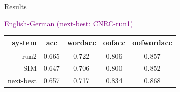 \documentclass[final,t]{beamer}
\begin{document}
\begin{frame}{}
\begin{columns}[t]
\begin{column}{.5\linewidth}




\begin{block}{Results}

\begin{center}
  \textcolor{purple}{English-German (next-best: CNRC-run1)}
  \begin{center}
  \begin{tabular}{|r|c|c|c|c|}
    \hline
    system & acc      & wordacc  & oofacc & oofwordacc \\
    \hline
    run2  &  0.665 & 0.722  &  0.806  & 0.857 \\
    SIM    &  0.647 & 0.706 & 0.800 & 0.852 \\
    next-best     &  0.657   & 0.717   & 0.834 & 0.868    \\
    \hline
  \end{tabular}
  \end{center}


\end{center}
\end{block}
\end{column}
\end{columns}
\end{frame}
\end{document}
